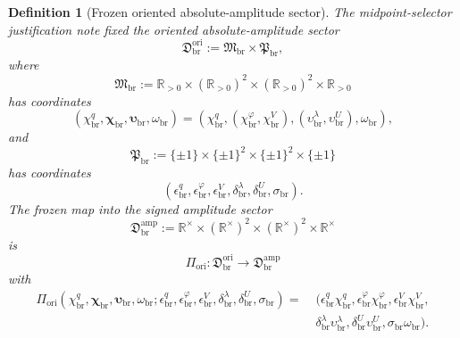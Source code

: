 \documentclass[11pt]{article}
\newcommand{\LiftSector}{\mathfrak D_{\mathrm{br}}^{\mathrm{amp}}}
\newcommand{\OriginSector}{\mathfrak D_{\mathrm{br}}^{\mathrm{ori}}}
\newcommand{\AbsAmpSector}{\mathfrak M_{\mathrm{br}}}
\newcommand{\PolaritySector}{\mathfrak P_{\mathrm{br}}}
\newcommand{\AbsReadAmp}{\chi_{\mathrm{br}}^{q}}
\newcommand{\AbsCovAmp}{\chi_{\mathrm{br}}^{\varphi}}
\newcommand{\AbsRelaxAmp}{\chi_{\mathrm{br}}^{V}}
\newcommand{\AbsKinAmp}{\bm\chi_{\mathrm{br}}}
\newcommand{\AbsWellAmp}{\upsilon_{\mathrm{br}}^{\lambda}}
\newcommand{\AbsEqAmp}{\upsilon_{\mathrm{br}}^{U}}
\newcommand{\AbsAnchorAmp}{\bm\upsilon_{\mathrm{br}}}
\newcommand{\AbsScaleAmp}{\omega_{\mathrm{br}}}
\newcommand{\PolRead}{\epsilon_{\mathrm{br}}^{q}}
\newcommand{\PolCov}{\epsilon_{\mathrm{br}}^{\varphi}}
\newcommand{\PolRelax}{\epsilon_{\mathrm{br}}^{V}}
\newcommand{\PolWell}{\delta_{\mathrm{br}}^{\lambda}}
\newcommand{\PolEq}{\delta_{\mathrm{br}}^{U}}
\newcommand{\PolScale}{\sigma_{\mathrm{br}}}
\newcommand{\OriginMap}{\Pi_{\mathrm{ori}}}
\newcommand{\Rstar}{\mathbb R^{\times}}
\newtheorem{definition}{Definition}
\begin{document}
\begin{definition}[Frozen oriented absolute-amplitude sector]
\label{def:frozenorigin}
The midpoint-selector justification note fixed the oriented absolute-amplitude sector
\begin{equation}
\OriginSector
:=
\AbsAmpSector\times\PolaritySector,
\label{eq:originsector}
\end{equation}
where
\begin{equation}
\AbsAmpSector
:=
\mathbb R_{>0}\times(\mathbb R_{>0})^{2}\times(\mathbb R_{>0})^{2}\times\mathbb R_{>0}
\label{eq:abssector}
\end{equation}
has coordinates
\begin{equation}
(\AbsReadAmp,\AbsKinAmp,\AbsAnchorAmp,\AbsScaleAmp)
=
(\AbsReadAmp,(\AbsCovAmp,\AbsRelaxAmp),(\AbsWellAmp,\AbsEqAmp),\AbsScaleAmp),
\label{eq:abscoords}
\end{equation}
and
\begin{equation}
\PolaritySector
:=
\{\pm1\}\times\{\pm1\}^{2}\times\{\pm1\}^{2}\times\{\pm1\}
\label{eq:polsector}
\end{equation}
has coordinates
\begin{equation}
(\PolRead,\PolCov,\PolRelax,\PolWell,\PolEq,\PolScale).
\label{eq:polcoords}
\end{equation}
The frozen map into the signed amplitude sector
\begin{equation}
\LiftSector
:=
\Rstar\times(\Rstar)^{2}\times(\Rstar)^{2}\times\Rstar
\label{eq:liftsector}
\end{equation}
is
\begin{equation}
\OriginMap:\OriginSector\longrightarrow\LiftSector
\label{eq:originmap}
\end{equation}
with
\begin{align}
\OriginMap(\AbsReadAmp,\AbsKinAmp,\AbsAnchorAmp,\AbsScaleAmp;\PolRead,\PolCov,\PolRelax,\PolWell,\PolEq,\PolScale)
=\;&
(\PolRead\AbsReadAmp,\PolCov\AbsCovAmp,\PolRelax\AbsRelaxAmp,
\nonumber\\
&\PolWell\AbsWellAmp,\PolEq\AbsEqAmp,\PolScale\AbsScaleAmp).
\label{eq:originmapexplicit}
\end{align}
\end{definition}
\end{document}
